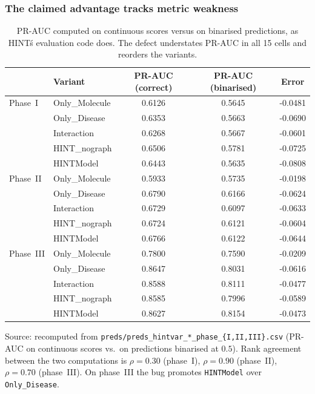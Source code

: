 \documentclass[a4paper,fleqn]{cas-sc}
\begin{document}
\subsubsection{The claimed advantage tracks metric weakness}
\label{sec:metricweak}
\begin{table}[t]
\centering
\small
\caption{PR-AUC computed on continuous scores versus on binarised predictions, as HINT\'s evaluation code does. The defect understates PR-AUC in all 15 cells and reorders the variants.}
\label{tab:praucbug}
\begin{tabular}{llccc}
\toprule
 & Variant & PR-AUC (correct) & PR-AUC (binarised) & Error \\
\midrule
Phase~I & Only\_Molecule & 0.6126 & 0.5645 & -0.0481 \\
 & Only\_Disease & 0.6353 & 0.5663 & -0.0690 \\
 & Interaction & 0.6268 & 0.5667 & -0.0601 \\
 & HINT\_nograph & 0.6506 & 0.5781 & -0.0725 \\
 & HINTModel & 0.6443 & 0.5635 & -0.0808 \\
Phase~II & Only\_Molecule & 0.5933 & 0.5735 & -0.0198 \\
 & Only\_Disease & 0.6790 & 0.6166 & -0.0624 \\
 & Interaction & 0.6729 & 0.6097 & -0.0633 \\
 & HINT\_nograph & 0.6724 & 0.6121 & -0.0604 \\
 & HINTModel & 0.6766 & 0.6122 & -0.0644 \\
Phase~III & Only\_Molecule & 0.7800 & 0.7590 & -0.0209 \\
 & Only\_Disease & 0.8647 & 0.8031 & -0.0616 \\
 & Interaction & 0.8588 & 0.8111 & -0.0477 \\
 & HINT\_nograph & 0.8585 & 0.7996 & -0.0589 \\
 & HINTModel & 0.8627 & 0.8154 & -0.0473 \\
\bottomrule
\end{tabular}
\begin{minipage}{\linewidth}\vspace{2pt}\scriptsize Source: recomputed from \texttt{preds/preds\_hintvar\_*\_phase\_\{I,II,III\}.csv} (PR-AUC on continuous scores vs.\ on predictions binarised at $0.5$). Rank agreement between the two computations is $\rho=0.30$ (phase~I), $\rho=0.90$ (phase~II), $\rho=0.70$ (phase~III). On phase~III the bug promotes \texttt{HINTModel} over \texttt{Only\_Disease}. \end{minipage}
\end{table}
\end{document}
